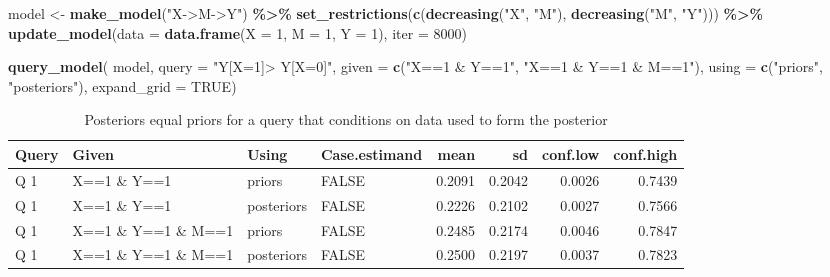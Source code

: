 \documentclass[
  12pt,
]{book}
\newenvironment{Shaded}{\begin{snugshade}}{\end{snugshade}}
\newcommand{\AttributeTok}[1]{\textcolor[rgb]{0.13,0.29,0.53}{#1}}
\newcommand{\ConstantTok}[1]{\textcolor[rgb]{0.56,0.35,0.01}{#1}}
\newcommand{\DecValTok}[1]{\textcolor[rgb]{0.00,0.00,0.81}{#1}}
\newcommand{\FunctionTok}[1]{\textcolor[rgb]{0.13,0.29,0.53}{\textbf{#1}}}
\newcommand{\NormalTok}[1]{#1}
\newcommand{\OtherTok}[1]{\textcolor[rgb]{0.56,0.35,0.01}{#1}}
\newcommand{\SpecialCharTok}[1]{\textcolor[rgb]{0.81,0.36,0.00}{\textbf{#1}}}
\newcommand{\StringTok}[1]{\textcolor[rgb]{0.31,0.60,0.02}{#1}}
\begin{document}
\begin{Shaded}
\begin{Highlighting}[]
\NormalTok{model }\OtherTok{\textless{}{-}} \FunctionTok{make\_model}\NormalTok{(}\StringTok{"X{-}\textgreater{}M{-}\textgreater{}Y"}\NormalTok{) }\SpecialCharTok{\%\textgreater{}\%} 
  \FunctionTok{set\_restrictions}\NormalTok{(}\FunctionTok{c}\NormalTok{(}\FunctionTok{decreasing}\NormalTok{(}\StringTok{"X"}\NormalTok{, }\StringTok{"M"}\NormalTok{), }\FunctionTok{decreasing}\NormalTok{(}\StringTok{"M"}\NormalTok{, }\StringTok{"Y"}\NormalTok{))) }\SpecialCharTok{\%\textgreater{}\%}
  \FunctionTok{update\_model}\NormalTok{(}\AttributeTok{data =} \FunctionTok{data.frame}\NormalTok{(}\AttributeTok{X =} \DecValTok{1}\NormalTok{, }\AttributeTok{M =} \DecValTok{1}\NormalTok{, }\AttributeTok{Y =} \DecValTok{1}\NormalTok{), }\AttributeTok{iter =} \DecValTok{8000}\NormalTok{)}

\FunctionTok{query\_model}\NormalTok{(}
\NormalTok{            model, }
            \AttributeTok{query =} \StringTok{"Y[X=1]\textgreater{} Y[X=0]"}\NormalTok{,}
            \AttributeTok{given =} \FunctionTok{c}\NormalTok{(}\StringTok{"X==1 \& Y==1"}\NormalTok{, }\StringTok{"X==1 \& Y==1 \& M==1"}\NormalTok{),}
            \AttributeTok{using =} \FunctionTok{c}\NormalTok{(}\StringTok{"priors"}\NormalTok{, }\StringTok{"posteriors"}\NormalTok{),}
            \AttributeTok{expand\_grid =} \ConstantTok{TRUE}\NormalTok{)}
\end{Highlighting}
\end{Shaded}

\begin{table}

\caption{\label{tab:unnamed-chunk-48}Posteriors equal priors for a query that conditions on data used to form the posterior }
\centering
\begin{tabular}[t]{l|l|l|l|r|r|r|r}
\hline
Query & Given & Using & Case.estimand & mean & sd & conf.low & conf.high\\
\hline
Q 1 & X==1 \& Y==1 & priors & FALSE & 0.2091 & 0.2042 & 0.0026 & 0.7439\\
\hline
Q 1 & X==1 \& Y==1 & posteriors & FALSE & 0.2226 & 0.2102 & 0.0027 & 0.7566\\
\hline
Q 1 & X==1 \& Y==1 \& M==1 & priors & FALSE & 0.2485 & 0.2174 & 0.0046 & 0.7847\\
\hline
Q 1 & X==1 \& Y==1 \& M==1 & posteriors & FALSE & 0.2500 & 0.2197 & 0.0037 & 0.7823\\
\hline
\end{tabular}
\end{table}
\end{document}
